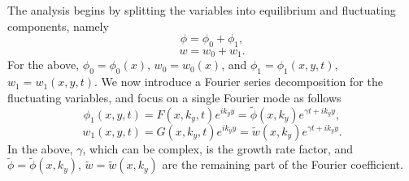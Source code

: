 \documentclass[oneside,a4paper,11pt]{report}
\begin{document}
The analysis begins by splitting the variables into equilibrium and fluctuating components, namely
\begin{equation}
    \phi = \phi_0 + \phi_1,
\end{equation}
\begin{equation}
    w = w_0 + w_1.
\end{equation}
For the above, $\phi_0 = \phi_0(x)$, $w_0 = w_0(x)$, and $\phi_1 = \phi_1(x,y,t)$, $w_1 = w_1(x,y,t)$. We now introduce a Fourier series decomposition for the fluctuating variables, and focus on a single Fourier mode as follows 
\begin{equation}
    \phi_1(x,y,t) = F(x,k_y,t) e^{ik_y y} = \tilde{\phi}(x,k_y) e^{\gamma t + i k_y y},
\end{equation}
\begin{equation}
    w_1(x,y,t) = G(x,k_y,t) e^{ik_y y} = \tilde{w}(x,k_y) e^{\gamma t + i k_y y}.
\end{equation}
In the above, $\gamma$, which can be complex, is the growth rate factor, and $\tilde{\phi} = \tilde{\phi}(x, k_y)$, $\tilde{w} = \tilde{w}(x, k_y)$ are the remaining part of the Fourier coefficient.
\end{document}
